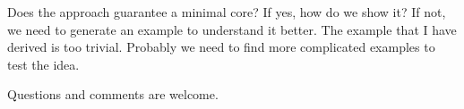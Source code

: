 \begin{Problem}
Does the approach guarantee a minimal core? If yes, how do we show it?
If not, we need to generate an example to understand it better. The
example that I have derived is too trivial. Probably we need to find
more complicated examples to test the idea. 
\end{Problem}

Questions and comments are welcome. 


